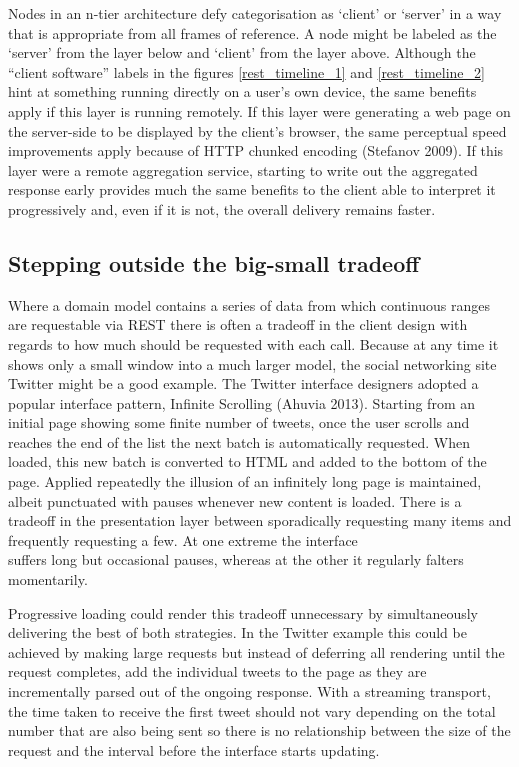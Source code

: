 \documentclass[12pt, ]{article}
\begin{document}
Nodes in an n-tier architecture defy categorisation as `client' or
`server' in a way that is appropriate from all frames of reference. A
node might be labeled as the `server' from the layer below and `client'
from the layer above. Although the ``client software'' labels in the
figures \ref{rest_timeline_1} and \ref{rest_timeline_2} hint at
something running directly on a user's own device, the same benefits
apply if this layer is running remotely. If this layer were generating a
web page on the server-side to be displayed by the client's browser, the
same perceptual speed improvements apply because of HTTP chunked
encoding (Stefanov 2009). If this layer were a remote aggregation
service, starting to write out the aggregated response early provides
much the same benefits to the client able to interpret it progressively
and, even if it is not, the overall delivery remains faster.

\subsection{Stepping outside the big-small
tradeoff}\label{stepping-outside-the-big-small-tradeoff}

Where a domain model contains a series of data from which continuous
ranges are requestable via REST there is often a tradeoff in the client
design with regards to how much should be requested with each call.
Because at any time it shows only a small window into a much larger
model, the social networking site Twitter might be a good example. The
Twitter interface designers adopted a popular interface pattern,
Infinite Scrolling (Ahuvia 2013). Starting from an initial page showing
some finite number of tweets, once the user scrolls and reaches the end
of the list the next batch is automatically requested. When loaded, this
new batch is converted to HTML and added to the bottom of the page.
Applied repeatedly the illusion of an infinitely long page is
maintained, albeit punctuated with pauses whenever new content is
loaded. There is a tradeoff in the presentation layer between
sporadically requesting many items and frequently requesting a few. At
one extreme the interface\\suffers long but occasional pauses, whereas
at the other it regularly falters momentarily.

Progressive loading could render this tradeoff unnecessary by
simultaneously delivering the best of both strategies. In the Twitter
example this could be achieved by making large requests but instead of
deferring all rendering until the request completes, add the individual
tweets to the page as they are incrementally parsed out of the ongoing
response. With a streaming transport, the time taken to receive the
first tweet should not vary depending on the total number that are also
being sent so there is no relationship between the size of the request
and the interval before the interface starts updating.
\end{document}
